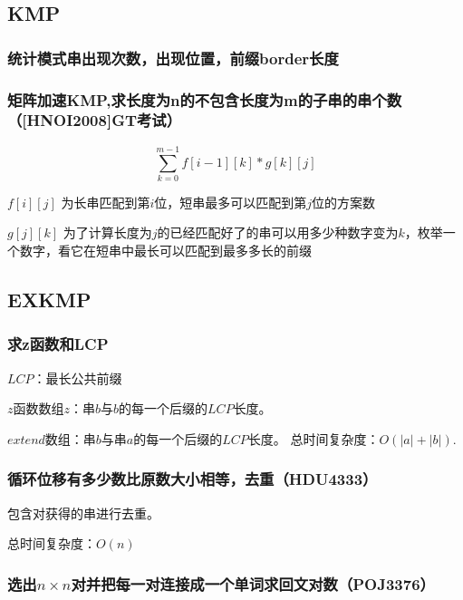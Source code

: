 \documentclass[twoside,a4paper]{article}
\begin{document}
\subsection{KMP}

\subsubsection{统计模式串出现次数，出现位置，前缀border长度}


\subsubsection{矩阵加速KMP,求长度为n的不包含长度为m的子串的串个数（[HNOI2008]GT考试）}
$$\sum_{k=0}^{m-1}f[i-1][k]\ast g[k][j]$$\par
$f[i][j]$ 为长串匹配到第$i$位，短串最多可以匹配到第$j$位的方案数\par
$g[j][k]$ 为了计算长度为$j$的已经匹配好了的串可以用多少种数字变为$k$，枚举一个数字，看它在短串中最长可以匹配到最多多长的前缀\par


\subsection{EXKMP}

\subsubsection{求z函数和LCP}
$LCP$：最长公共前缀\par
$z$函数数组$z$：串$b$与$b$的每一个后缀的$LCP$长度。\par
$extend$数组：串$b$与串$a$的每一个后缀的$LCP$长度。
总时间复杂度：$O(|a|+|b|)$.


\subsubsection{循环位移有多少数比原数大小相等，去重（HDU4333）}
包含对获得的串进行去重。\par
总时间复杂度：$O(n)$


\subsubsection{选出$n × n$对并把每一对连接成一个单词求回文对数（POJ3376）}

\end{document}
